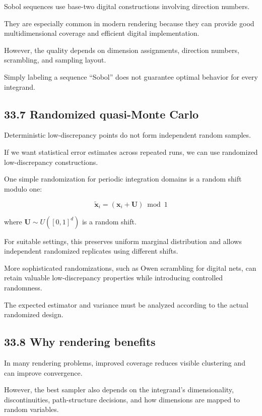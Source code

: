 Sobol sequences use base-two digital constructions involving direction numbers.

They are especially common in modern rendering because they can provide good multidimensional coverage and efficient digital implementation.

However, the quality depends on dimension assignments, direction numbers, scrambling, and sampling layout.

Simply labeling a sequence ``Sobol'' does not guarantee optimal behavior for every integrand.

\subsection{33.7 Randomized quasi-Monte Carlo}\label{02-foundations-ii-ch031-randomized-quasi-monte-carlo}

Deterministic low-discrepancy points do not form independent random samples.

If we want statistical error estimates across repeated runs, we can use randomized low-discrepancy constructions.

One simple randomization for periodic integration domains is a random shift modulo one:

\[ \boxed{ \tilde{\mathbf x}_i = (\mathbf x_i+\mathbf U)\bmod1 } \]

where \(\mathbf U\sim U([0,1]^d)\) is a random shift.

For suitable settings, this preserves uniform marginal distribution and allows independent randomized replicates using different shifts.

More sophisticated randomizations, such as Owen scrambling for digital nets, can retain valuable low-discrepancy properties while introducing controlled randomness.

The expected estimator and variance must be analyzed according to the actual randomized design.

\subsection{33.8 Why rendering benefits}\label{02-foundations-ii-ch031-why-rendering-benefits}

In many rendering problems, improved coverage reduces visible clustering and can improve convergence.

However, the best sampler also depends on the integrand's dimensionality, discontinuities, path-structure decisions, and how dimensions are mapped to random variables.

